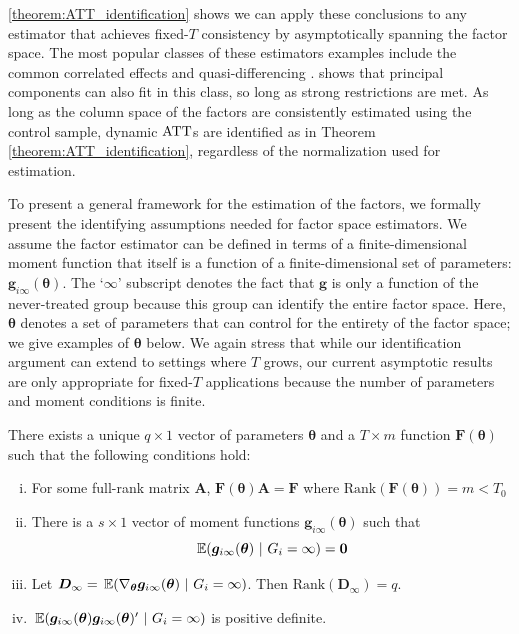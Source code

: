 \documentclass[12pt]{article}
\begin{document}
\autoref{theorem:ATT_identification} shows we can apply these conclusions to any estimator that achieves fixed-$T$ consistency by asymptotically spanning the factor space. The most popular classes of these estimators examples include the common correlated effects \citep{pesaran2006estimation} and quasi-differencing \citep{Ahn_Lee_Schmidt_2013}. \citet{Westerlund_2020} shows that principal components can also fit in this class, so long as strong restrictions are met. As long as the column space of the factors are consistently estimated using the control sample, dynamic $\text{ATT}$s are identified as in Theorem \ref{theorem:ATT_identification}, regardless of the normalization used for estimation. 

To present a general framework for the estimation of the factors, we formally present the identifying assumptions needed for factor space estimators. We assume the factor estimator can be defined in terms of a finite-dimensional moment function that itself is a function of a finite-dimensional set of parameters: $\bm g_{i\infty}(\bm \theta)$. The `$\infty$' subscript denotes the fact that $\bm g$ is only a function of the never-treated group because this group can identify the entire factor space. Here, $\bm \theta$ denotes a set of parameters that can control for the entirety of the factor space; we give examples of $\bm \theta$ below. We again stress that while our identification argument can extend to settings where $T$ grows, our current asymptotic results are only appropriate for fixed-$T$ applications because the number of parameters and moment conditions is finite.
\begin{assumption}\label{asm:factor_identification}
  There exists a unique $q \times 1$ vector of parameters $\bm{\theta}$ and a $T \times m$ function $\bm{F}(\bm{\theta})$ such that the following conditions hold:
  \begin{enumerate}[(i)]
    \item For some full-rank matrix $\bm{A}$, $\bm{F}(\bm{\theta}) \bm{A} = \bm{F}$ where $\text{Rank}(\bm{F}(\bm{\theta})) = m < T_0$ 
    \item There is a $s \times 1$ vector of moment functions $\bm g_{i\infty}(\bm{\theta})$ such that 
    \begin{equation}\label{eq:factor_moments}
      \expec{\bm g_{i\infty}(\bm{\theta})}{G_i = \infty} = \bm 0
    \end{equation}
    
    \item Let $\bm D_{\infty} = \expec{\nabla_{\bm{\theta}} \bm g_{i \infty}(\bm{\theta})}{G_i = \infty}$. Then $\text{Rank}(\bm D_{\infty}) = q$.
    \item $\expec{\bm g_{i \infty}(\bm{\theta}) \bm g_{i \infty}(\bm{\theta})'}{G_i = \infty}$ is positive definite. 
  \end{enumerate}
\end{assumption}
\end{document}
